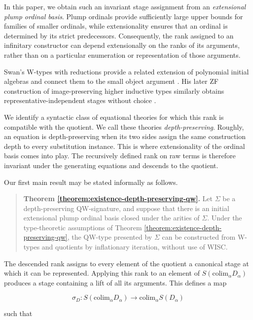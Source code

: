 \documentclass[runningheads]{llncs}
\begin{document}
In this paper, we obtain such an invariant stage assignment from an
\emph{extensional plump ordinal basis}. Plump ordinals provide
sufficiently large upper bounds for families of smaller ordinals, while
extensionality ensures that an ordinal is determined by its strict
predecessors. Consequently, the rank assigned to an infinitary
constructor can depend extensionally on the ranks of its arguments,
rather than on a particular enumeration or representation of those
arguments.

Swan's W-types with reductions provide a related extension of polynomial
initial algebras and connect them to the small object argument
\citep{swan2018-w-types-reductions}. His later ZF construction of
image-preserving higher inductive types similarly obtains
representative-independent stages without choice
\citep{swan2022-hits-in-zf}.

We identify a syntactic class of equational theories for which this rank
is compatible with the quotient. We call these theories
\emph{depth-preserving}. Roughly, an equation is depth-preserving when
its two sides assign the same construction depth to every substitution
instance. This is where extensionality of the ordinal basis comes
into play. The recursively defined rank on raw terms is therefore
invariant under the generating equations and descends to the quotient.

Our first main result may be stated informally as follows.

\begin{quote}
\textbf{Theorem \ref{theorem:existence-depth-preserving-qw}.} Let \(\Sigma\) be a depth-preserving QW-signature, and
suppose that there is an initial extensional plump ordinal basis closed
under the arities of \(\Sigma\). Under the type-theoretic assumptions of
Theorem \ref{theorem:existence-depth-preserving-qw}, the QW-type presented by \(\Sigma\) can be constructed from
W-types and quotients by inflationary iteration, without use of WISC.
\end{quote}

The descended rank assigns to every element of the quotient a canonical
stage at which it can be represented. Applying this rank to an element
of \(S \left(\mathrm{colim}_\alpha D_\alpha\right)\) produces a stage containing a
lift of all its arguments. This defines a map

\[
\sigma_D :
S \left(\mathrm{colim}_\alpha D_\alpha\right)
\longrightarrow
\mathrm{colim}_\alpha S (D_\alpha)
\]

such that
\end{document}
